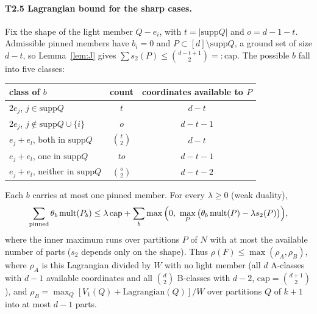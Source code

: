 \documentclass[11pt]{article}
\newcommand{\mult}{\operatorname{mult}}
\theoremstyle{definition}
\theoremstyle{remark}
\begin{document}
\paragraph{T2.5 Lagrangian bound for the sharp cases.} Fix the shape of the light member $Q-e_i$, with $t=|\mathrm{supp}Q|$ and $o=d-1-t$.
Admissible pinned members have $b_i=0$ and $P\subset[d]\setminus\mathrm{supp}Q$, a ground set of size $d-t$, so Lemma~\ref{lem:J} gives
$\sum s_2(P)\le\binom{d-t+1}2=:\mathrm{cap}$. The possible $b$ fall into five classes:
\begin{center}\small
\begin{tabular}{lcc}\toprule
class of $b$ & count & coordinates available to $P$\\\midrule
$2e_j$, $j\in\mathrm{supp}Q$ & $t$ & $d-t$\\
$2e_j$, $j\notin\mathrm{supp}Q\cup\{i\}$ & $o$ & $d-t-1$\\
$e_j+e_l$, both in $\mathrm{supp}Q$ & $\binom t2$ & $d-t$\\
$e_j+e_l$, one in $\mathrm{supp}Q$ & $to$ & $d-t-1$\\
$e_j+e_l$, neither in $\mathrm{supp}Q$ & $\binom o2$ & $d-t-2$\\\bottomrule
\end{tabular}
\end{center}
Each $b$ carries at most one pinned member. For every $\lambda\ge0$ (weak duality),
\[
\sum_{\rm pinned}\theta_b\mult(P_b)\le\lambda\,\mathrm{cap}+\sum_b\max\Big(0,\ \max_P\big(\theta_b\mult(P)-\lambda s_2(P)\big)\Big),
\]
where the inner maximum runs over partitions $P$ of $N$ with at most the available number of parts ($s_2$ depends only on the shape). Thus
$\rho(F)\le\max(\rho_A,\rho_B)$, where $\rho_A$ is this Lagrangian divided by $W$ with no light member (all $d$ A-classes with $d-1$ available
coordinates and all $\binom d2$ B-classes with $d-2$, $\mathrm{cap}=\binom{d+1}2$), and $\rho_B=\max_Q[V_1(Q)+\text{Lagrangian}(Q)]/W$ over
partitions $Q$ of $k+1$ into at most $d-1$ parts.
\end{document}
